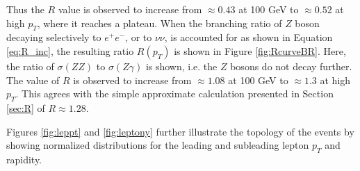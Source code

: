 \documentclass[12pt,a4paper,openright,twoside]{report}
\newcommand{\ZZ}{$ZZ\to \ell\ell\nu\nu$ }
\newcommand{\Zg}{$Z\gamma\to \ell\ell\gamma$ }
\begin{document}
Thus the $R$ value is observed to increase from $\approx 0.43$ at 100 GeV to $\approx 0.52$ at high $p_T$, where it reaches a plateau. When the branching ratio of $Z$ boson decaying selectively to $e^+e^-$, or to $\nu\nu$, is accounted for as shown in Equation \ref{eq:R_inc}, the resulting ratio $R(p_T)$ is shown in Figure \ref{fig:RcurveBR}. Here, the ratio of $\sigma(ZZ)$ to $\sigma(Z\gamma)$ is shown, i.e. the $Z$ bosons do not decay further. The value of $R$ is observed to increase from $\approx 1.08$ at 100 GeV to $\approx 1.3$ at high $p_T$. This agrees with the simple approximate calculation presented in Section \ref{sec:R} of $R \approx 1.28$.

Figures \ref{fig:leppt} and \ref{fig:leptony} further illustrate the topology of the events by showing normalized distributions for the leading and subleading lepton $p_T$ and rapidity.
\end{document}
